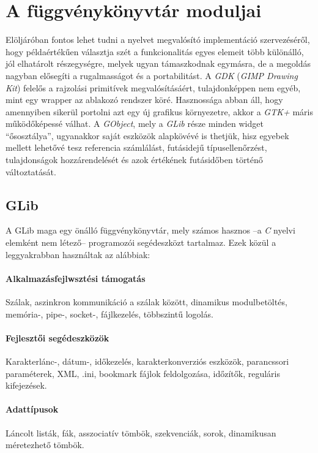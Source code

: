 
\section{A függvénykönyvtár moduljai}

Elöljáróban fontos lehet tudni a nyelvet megvalósító implementáció szervezéséről, hogy példaértékűen választja szét a funkcionalitás egyes elemeit több különálló, jól elhatárolt részegységre, melyek ugyan támaszkodnak egymásra, de a megoldás nagyban elősegíti a rugalmasságot és a portabilitást. A \textit{GDK} (\textit{GIMP Drawing Kit}) felelős a rajzolási primitívek megvalósításáért, tulajdonképpen nem egyéb, mint egy wrapper az ablakozó rendszer köré. Hasznossága abban áll, hogy amennyiben sikerül portolni azt egy új grafikus környezetre, akkor a \textit{GTK+} máris működőképessé válhat. A \textit{GObject}, mely a \textit{GLib} része minden widget ``ősosztálya'', ugyanakkor saját eszközök alapkövévé is thetjük, hisz egyebek mellett lehetővé tesz referencia számlálást, futásidejű típusellenőrzést, tulajdonságok hozzárendelését és azok értékének futásidőben történő változtatását.

\subsection{GLib}

A GLib maga egy önálló függvénykönyvtár, mely számos hasznos --a \textit{C} nyelvi elemként nem létező-- programozói segédeszközt tartalmaz. Ezek közül a leggyakrabban használtak az alábbiak:

\paragraph{Alkalmazásfejlwsztési támogatás} Szálak, aszinkron kommunikáció a szálak között, dinamikus modulbetöltés, memória-, pipe-, socket-, fájlkezelés, többszintű logolás.
\paragraph{Fejlesztői segédeszközök} Karakterlánc-, dátum-, időkezelés, karakterkonverziós eszközök, parancssori paraméterek, XML, .ini, bookmark fájlok feldolgozása, időzítők, reguláris kifejezések.
\paragraph{Adattípusok} Láncolt listák, fák, asszociatív tömbök, szekvenciák, sorok, dinamikusan méretezhető tömbök.

